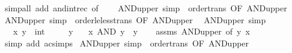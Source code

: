 \begin{isabellebody}
\isamarkupfalse%
\ {\isacharparenleft}{\kern0pt}simp{\isacharunderscore}{\kern0pt}all\ add{\isacharcolon}{\kern0pt}\ and{\isacharunderscore}{\kern0pt}int{\isacharunderscore}{\kern0pt}rec\ {\isacharbrackleft}{\kern0pt}of\ {\isacartoucheopen}{\isacharunderscore}{\kern0pt}\ {\isacharasterisk}{\kern0pt}\ {}{\isacartoucheclose}{\isacharbrackright}{\kern0pt}{\isacharparenright}{\kern0pt}%
\endisatagproof
{\isafoldproof}%
%
\isadelimproof
\isanewline
%
\endisadelimproof
\isanewline
{}\isamarkupfalse%
\ AND{\isacharunderscore}{\kern0pt}upper{}{\isacharprime}{\kern0pt}\ {\isacharbrackleft}{\kern0pt}simp{\isacharbrackright}{\kern0pt}\ {\isacharequal}{\kern0pt}\ order{\isacharunderscore}{\kern0pt}trans\ {\isacharbrackleft}{\kern0pt}OF\ AND{\isacharunderscore}{\kern0pt}upper{}{\isacharbrackright}{\kern0pt}\ \isanewline
{}\isamarkupfalse%
\ AND{\isacharunderscore}{\kern0pt}upper{}{\isacharprime}{\kern0pt}{\isacharprime}{\kern0pt}\ {\isacharbrackleft}{\kern0pt}simp{\isacharbrackright}{\kern0pt}\ {\isacharequal}{\kern0pt}\ order{\isacharunderscore}{\kern0pt}le{\isacharunderscore}{\kern0pt}less{\isacharunderscore}{\kern0pt}trans\ {\isacharbrackleft}{\kern0pt}OF\ AND{\isacharunderscore}{\kern0pt}upper{}{\isacharbrackright}{\kern0pt}\ \isanewline
\isanewline
{}\isamarkupfalse%
\ AND{\isacharunderscore}{\kern0pt}upper{}\ {\isacharbrackleft}{\kern0pt}simp{\isacharbrackright}{\kern0pt}{\isacharcolon}{\kern0pt}\ \isanewline
\ \ \ x\ y\ {\isacharcolon}{\kern0pt}{\isacharcolon}{\kern0pt}\ int\isanewline
\ \ \ {\isacartoucheopen}{}\ {\isasymle}\ y{\isacartoucheclose}\isanewline
\ \ \ {\isacartoucheopen}x\ AND\ y\ {\isasymle}\ y{\isacartoucheclose}\isanewline
%
\isadelimproof
\ \ %
\endisadelimproof
%
\isatagproof
{}\isamarkupfalse%
\ assms\ AND{\isacharunderscore}{\kern0pt}upper{}\ {\isacharbrackleft}{\kern0pt}of\ y\ x{\isacharbrackright}{\kern0pt}\ \isamarkupfalse%
\ {\isacharparenleft}{\kern0pt}simp\ add{\isacharcolon}{\kern0pt}\ ac{\isacharunderscore}{\kern0pt}simps{\isacharparenright}{\kern0pt}%
\endisatagproof
{\isafoldproof}%
%
\isadelimproof
\isanewline
%
\endisadelimproof
\isanewline
{}\isamarkupfalse%
\ AND{\isacharunderscore}{\kern0pt}upper{}{\isacharprime}{\kern0pt}\ {\isacharbrackleft}{\kern0pt}simp{\isacharbrackright}{\kern0pt}\ {\isacharequal}{\kern0pt}\ order{\isacharunderscore}{\kern0pt}trans\ {\isacharbrackleft}{\kern0pt}OF\ AND{\isacharunderscore}{\kern0pt}upper{}{\isacharbrackright}{\kern0pt}\ \isanewline

\end{isabellebody}
